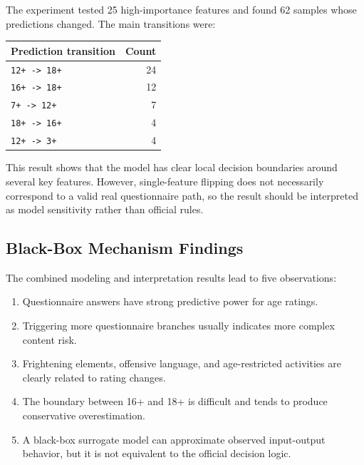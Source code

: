 \documentclass[UTF8,a4paper,12pt]{ctexart}
\newcounter{none}
\providecommand{\tightlist}{%
  \setlength{\itemsep}{0pt}\setlength{\parskip}{0pt}}
\begin{document}
The experiment tested 25 high-importance features and found 62 samples whose predictions changed. The main transitions were:

{\def\LTcaptype{none} %
\begin{longtable}[]{@{}lr@{}}
\toprule\noalign{}
Prediction transition & Count \\
\midrule\noalign{}
\endhead
\bottomrule\noalign{}
\endlastfoot
\texttt{12+\ -\textgreater{}\ 18+} & 24 \\
\texttt{16+\ -\textgreater{}\ 18+} & 12 \\
\texttt{7+\ -\textgreater{}\ 12+} & 7 \\
\texttt{18+\ -\textgreater{}\ 16+} & 4 \\
\texttt{12+\ -\textgreater{}\ 3+} & 4 \\
\end{longtable}
}

This result shows that the model has clear local decision boundaries around several key features. However, single-feature flipping does not necessarily correspond to a valid real questionnaire path, so the result should be interpreted as model sensitivity rather than official rules.

\subsection{Black-Box Mechanism Findings}\label{black-box-mechanism-findings}

The combined modeling and interpretation results lead to five observations:

\begin{enumerate}
\def\labelenumi{\arabic{enumi}.}
\tightlist
\item
  Questionnaire answers have strong predictive power for age ratings.
\item
  Triggering more questionnaire branches usually indicates more complex content risk.
\item
  Frightening elements, offensive language, and age-restricted activities are clearly related to rating changes.
\item
  The boundary between 16+ and 18+ is difficult and tends to produce conservative overestimation.
\item
  A black-box surrogate model can approximate observed input-output behavior, but it is not equivalent to the official decision logic.
\end{enumerate}
\end{document}
